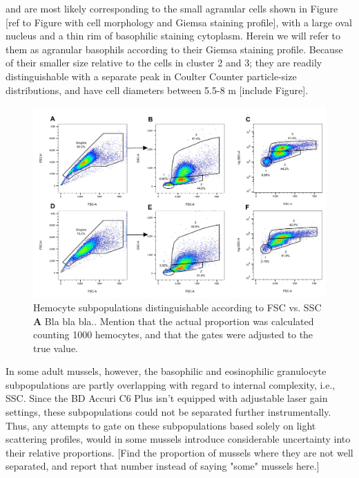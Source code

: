 and are most likely corresponding to the small agranular cells shown in Figure [ref to Figure with cell morphology and Giemsa staining profile], with a large oval nucleus and a thin rim of basophilic staining cytoplasm. Herein we will refer to them as agranular basophils according to their Giemsa staining profile. Because of their smaller size relative to the cells in cluster 2 and 3; they are readily distinguishable with a separate peak in Coulter Counter particle-size distributions, and have cell diameters between 5.5-8 \micro m [include Figure].



\begin{figure}[!ht]
    \centering
    \includegraphics[width=1.0\textwidth]{figures/Gating strategy/lin to log.pdf}
    \caption{Hemocyte subpopulations distinguishable according to FSC vs. SSC \textbf{A} Bla bla bla.. Mention that the actual proportion was calculated counting 1000 hemocytes, and that the gates were adjusted to the true value.}
    \label{fig:fsc_vs_ssc}
\end{figure}

In some adult mussels, however, the basophilic and eosinophilic granulocyte subpopulations are partly overlapping with regard to internal complexity, i.e., SSC. Since the BD Accuri C6 Plus isn't equipped with adjustable laser gain settings, these subpopulations could not be separated further instrumentally. Thus, any attempts to gate on these subpopulations based solely on light scattering profiles, would in some mussels introduce considerable uncertainty into their relative proportions. [Find the proportion of mussels where they are not well separated, and report that number instead of saying "some" mussels here.]

